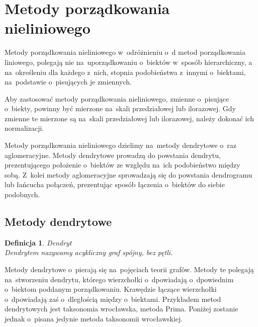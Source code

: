 \documentclass[12pt,a4paper]{report}
\newtheorem{definition}[theorem]{Definicja}
\begin{document}
\section{Metody porządkowania nieliniowego}


Metody porządkowania nieliniowego w~odróżnieniu o~d metod porządkowania liniowego, polegają nie na~uporządkowaniu o~biektów w~sposób hierarchiczny, a na~określeniu dla każdego z~nich, stopnia podobieństwa z~innymi o~biektami, na~podstawie o~pisujących je zmiennych. 

Aby zastosować metody porządkowania nieliniowego, zmienne o~pisujące o~biekty, powinny być mierzone na~skali przedziałowej lub ilorazowej. Gdy zmienne te mierzone są na~skali przedziałowej lub ilorazowej, należy dokonać ich normalizacji.

Metody porządkowania nieliniowego dzielimy na~metody dendrytowe o~raz aglomeracyjne. Metody dendrytowe prowadzą do powstania dendrytu, prezentującego położenie o~biektów ze względu na~ich podobieństwo między sobą. Z~kolei metody aglomeracyjne sprowadzają się do powstania dendrogramu lub łańcucha połączeń, prezentując sposób łączenia o~biektów do siebie podobnych. 

\subsection{Metody dendrytowe}

\begin{definition}{Dendryt \cite[Rozdział 2.3]{panek2013}}\\
Dendrytem nazywamy acykliczny graf spójny, bez pętli.
\end{definition}

Metody dendrytowe o~pierają się na~pojęciach teorii grafów. Metody te polegają na~stworzeniu dendrytu, którego wierzchołki o~dpowiadają o~dpowiednim o~biektom poddanym porządkowaniu. Krawędzie łączące wierzchołki o~dpowiadają zaś o~dległością między o~biektami. Przykładem metod dendrytowych jest taksonomia wrocławska, metoda Prima.   Poniżej zostanie jednak o~pisana jedynie metoda taksonomii wrocławskiej.  
\end{document}
